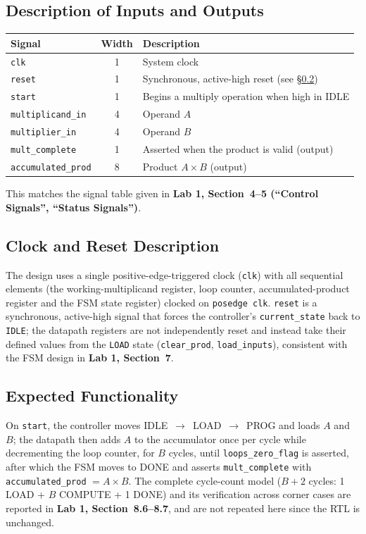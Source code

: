 \documentclass[11pt]{article}
\newcommand{\lab}[1]{\textbf{Lab 1, Section~#1}}
\begin{document}
\subsection{Description of Inputs and Outputs}
\begin{center}
\begin{tabular}{|l|c|l|}
\hline
\textbf{Signal} & \textbf{Width} & \textbf{Description} \\ \hline
\texttt{clk} & 1 & System clock \\ \hline
\texttt{reset} & 1 & Synchronous, active-high reset (see \S\ref{sec:clkrst}) \\ \hline
\texttt{start} & 1 & Begins a multiply operation when high in IDLE \\ \hline
\texttt{multiplicand\_in} & 4 & Operand $A$ \\ \hline
\texttt{multiplier\_in} & 4 & Operand $B$ \\ \hline
\texttt{mult\_complete} & 1 & Asserted when the product is valid (output) \\ \hline
\texttt{accumulated\_prod} & 8 & Product $A \times B$ (output) \\ \hline
\end{tabular}
\end{center}
This matches the signal table given in \lab{4--5 (``Control Signals'', ``Status Signals'')}.

\subsection{Clock and Reset Description}
\label{sec:clkrst}
The design uses a single positive-edge-triggered clock (\texttt{clk}) with all sequential elements
(the working-multiplicand register, loop counter, accumulated-product register and the FSM state
register) clocked on \texttt{posedge clk}. \texttt{reset} is a synchronous, active-high signal that
forces the controller's \texttt{current\_state} back to \texttt{IDLE}; the datapath registers are
not independently reset and instead take their defined values from the \texttt{LOAD} state
(\texttt{clear\_prod}, \texttt{load\_inputs}), consistent with the FSM design in \lab{7}.

\subsection{Expected Functionality}
On \texttt{start}, the controller moves IDLE~$\rightarrow$~LOAD~$\rightarrow$~PROG and loads $A$
and $B$; the datapath then adds $A$ to the accumulator once per cycle while decrementing the loop
counter, for $B$ cycles, until \texttt{loops\_zero\_flag} is asserted, after which the FSM moves to
DONE and asserts \texttt{mult\_complete} with \texttt{accumulated\_prod} $= A \times B$. The
complete cycle-count model ($B+2$ cycles: 1 LOAD + $B$ COMPUTE + 1 DONE) and its verification across
corner cases are reported in \lab{8.6--8.7}, and are not repeated here since the RTL is unchanged.
\end{document}
